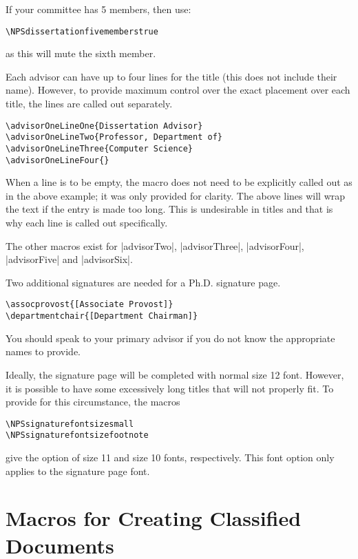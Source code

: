 If your committee has 5 members, then use:
\begin{Verbatim}
\NPSdissertationfivememberstrue
\end{Verbatim}

as this will mute the sixth member.

Each advisor can have up to four lines for the title (this does not include their name).  However, to provide maximum control over the exact placement over each title, the lines are called out separately.

\begin{Verbatim}
\advisorOneLineOne{Dissertation Advisor}
\advisorOneLineTwo{Professor, Department of}
\advisorOneLineThree{Computer Science}
\advisorOneLineFour{}
\end{Verbatim}

When a line is to be empty, the macro does not need to be explicitly called out as in the above example; it was only provided for clarity.  The above lines will wrap the text if the entry is made too long.  This is undesirable in titles and that is why each line is called out specifically.

The other macros exist for |advisorTwo|, |advisorThree|, |advisorFour|, |advisorFive| and |advisorSix|.

Two additional signatures are needed for a Ph.D. signature page.  

\begin{Verbatim}
\assocprovost{[Associate Provost]}
\departmentchair{[Department Chairman]}
\end{Verbatim}

You should speak to your primary advisor if you do not know the appropriate names to provide.

Ideally, the signature page will be completed with normal size 12 font.  However, it is possible to have some excessively long titles that will not properly fit.  To provide for this circumstance, the macros

\begin{Verbatim}
\NPSsignaturefontsizesmall
\NPSsignaturefontsizefootnote
\end{Verbatim}

give the option of size 11 and size 10 fonts, respectively.  This font option only applies to the signature page font.

\section{Macros for Creating Classified Documents}

